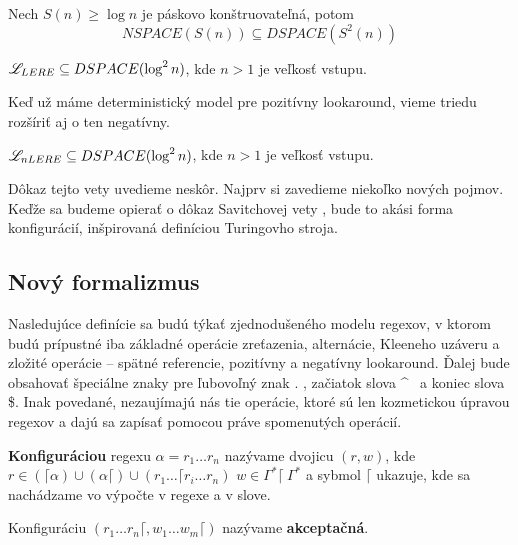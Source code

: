 \begin{veta}
Nech $S(n)\geq \log n$ je páskovo konštruovateľná, potom 
$$ NSPACE(S(n)) \subseteq DSPACE(S^2(n)) $$
\end{veta}

\begin{dosledok}\label{le_dspace_log2n}
$\mathscr{L}_{LERE} \subseteq DSPACE(\log^2 n)$, kde $n>1$ je veľkosť vstupu.
\end{dosledok}

Keď už máme deterministický model pre pozitívny lookaround, vieme triedu rozšíriť aj o ten negatívny.
\begin{veta}\label{dspace_log2n}
$\mathscr{L}_{nLERE} \subseteq DSPACE(\log^2 n)$, kde $n>1$ je veľkosť vstupu.
\end{veta}
Dôkaz tejto vety uvedieme neskôr. Najprv si zavedieme niekoľko nových pojmov. Keďže sa budeme opierať o dôkaz Savitchovej vety \cite{Savitch_skripta}, bude to akási forma konfigurácií, inšpirovaná definíciou Turingovho stroja.

\subsection{Nový formalizmus}

Nasledujúce definície sa budú týkať zjednodušeného modelu regexov, v ktorom budú prípustné iba základné operácie zreťazenia, alternácie, Kleeneho uzáveru a zložité operácie -- spätné referencie, pozitívny a negatívny lookaround. Ďalej bude obsahovať špeciálne znaky pre ľubovoľný znak . , začiatok slova \textasciicircum~ a koniec slova \$. Inak povedané, nezaujímajú nás tie operácie, ktoré sú len kozmetickou úpravou regexov a dajú sa zapísať pomocou práve spomenutých operácií.

\begin{df}
\textbf{Konfiguráciou} regexu $\alpha = r_1 \dots r_n$ nazývame dvojicu $(r, w)$, kde $r \in (\lceil\alpha)\cup(\alpha\lceil)\cup(r_1 \dots \lceil r_i \dots r_n)$ $w \in \Gamma^*\lceil~ \Gamma^*$ a sybmol $\lceil$ ukazuje, kde sa nachádzame vo výpočte v regexe a v slove.
\end{df}

\begin{df}
Konfiguráciu $(r_1 \dots r_n \lceil, w_1\dots w_m \lceil)$ nazývame \textbf{akceptačná}.
\end{df}

